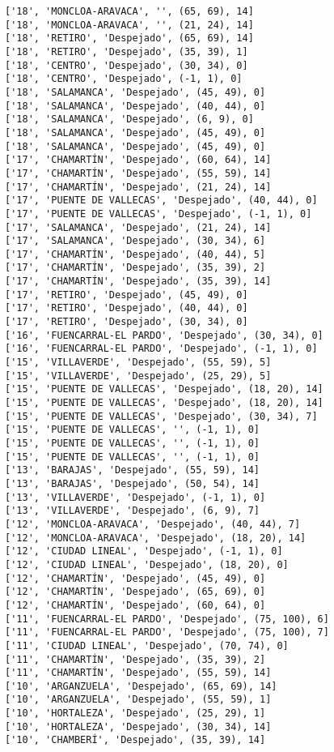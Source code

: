 \documentclass[11pt]{article}
\begin{document}
\begin{Verbatim}[commandchars=\\\{\}]
['18', 'MONCLOA-ARAVACA', '', (65, 69), 14]
['18', 'MONCLOA-ARAVACA', '', (21, 24), 14]
['18', 'RETIRO', 'Despejado', (65, 69), 14]
['18', 'RETIRO', 'Despejado', (35, 39), 1]
['18', 'CENTRO', 'Despejado', (30, 34), 0]
['18', 'CENTRO', 'Despejado', (-1, 1), 0]
['18', 'SALAMANCA', 'Despejado', (45, 49), 0]
['18', 'SALAMANCA', 'Despejado', (40, 44), 0]
['18', 'SALAMANCA', 'Despejado', (6, 9), 0]
['18', 'SALAMANCA', 'Despejado', (45, 49), 0]
['18', 'SALAMANCA', 'Despejado', (45, 49), 0]
['17', 'CHAMARTÍN', 'Despejado', (60, 64), 14]
['17', 'CHAMARTÍN', 'Despejado', (55, 59), 14]
['17', 'CHAMARTÍN', 'Despejado', (21, 24), 14]
['17', 'PUENTE DE VALLECAS', 'Despejado', (40, 44), 0]
['17', 'PUENTE DE VALLECAS', 'Despejado', (-1, 1), 0]
['17', 'SALAMANCA', 'Despejado', (21, 24), 14]
['17', 'SALAMANCA', 'Despejado', (30, 34), 6]
['17', 'CHAMARTÍN', 'Despejado', (40, 44), 5]
['17', 'CHAMARTÍN', 'Despejado', (35, 39), 2]
['17', 'CHAMARTÍN', 'Despejado', (35, 39), 14]
['17', 'RETIRO', 'Despejado', (45, 49), 0]
['17', 'RETIRO', 'Despejado', (40, 44), 0]
['17', 'RETIRO', 'Despejado', (30, 34), 0]
['16', 'FUENCARRAL-EL PARDO', 'Despejado', (30, 34), 0]
['16', 'FUENCARRAL-EL PARDO', 'Despejado', (-1, 1), 0]
['15', 'VILLAVERDE', 'Despejado', (55, 59), 5]
['15', 'VILLAVERDE', 'Despejado', (25, 29), 5]
['15', 'PUENTE DE VALLECAS', 'Despejado', (18, 20), 14]
['15', 'PUENTE DE VALLECAS', 'Despejado', (18, 20), 14]
['15', 'PUENTE DE VALLECAS', 'Despejado', (30, 34), 7]
['15', 'PUENTE DE VALLECAS', '', (-1, 1), 0]
['15', 'PUENTE DE VALLECAS', '', (-1, 1), 0]
['15', 'PUENTE DE VALLECAS', '', (-1, 1), 0]
['13', 'BARAJAS', 'Despejado', (55, 59), 14]
['13', 'BARAJAS', 'Despejado', (50, 54), 14]
['13', 'VILLAVERDE', 'Despejado', (-1, 1), 0]
['13', 'VILLAVERDE', 'Despejado', (6, 9), 7]
['12', 'MONCLOA-ARAVACA', 'Despejado', (40, 44), 7]
['12', 'MONCLOA-ARAVACA', 'Despejado', (18, 20), 14]
['12', 'CIUDAD LINEAL', 'Despejado', (-1, 1), 0]
['12', 'CIUDAD LINEAL', 'Despejado', (18, 20), 0]
['12', 'CHAMARTÍN', 'Despejado', (45, 49), 0]
['12', 'CHAMARTÍN', 'Despejado', (65, 69), 0]
['12', 'CHAMARTÍN', 'Despejado', (60, 64), 0]
['11', 'FUENCARRAL-EL PARDO', 'Despejado', (75, 100), 6]
['11', 'FUENCARRAL-EL PARDO', 'Despejado', (75, 100), 7]
['11', 'CIUDAD LINEAL', 'Despejado', (70, 74), 0]
['11', 'CHAMARTÍN', 'Despejado', (35, 39), 2]
['11', 'CHAMARTÍN', 'Despejado', (55, 59), 14]
['10', 'ARGANZUELA', 'Despejado', (65, 69), 14]
['10', 'ARGANZUELA', 'Despejado', (55, 59), 1]
['10', 'HORTALEZA', 'Despejado', (25, 29), 1]
['10', 'HORTALEZA', 'Despejado', (30, 34), 14]
['10', 'CHAMBERÍ', 'Despejado', (35, 39), 14]

\end{Verbatim}
\end{document}
